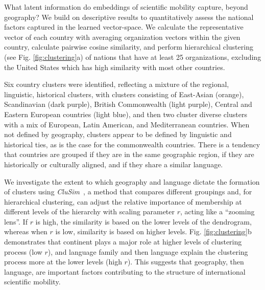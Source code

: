 \documentclass[12pt]{article} %
\begin{document}
What latent information do embeddings of scientific mobility capture, beyond geography? 
We build on descriptive results to quantitatively assess the national factors captured in the learned vector-space.
We calculate the representative vector of each country with averaging organization vectors within the given country, calculate pairwise cosine similarity, and perform hierarchical clustering (see Fig. \ref{fig:clustering}a) of nations that have at least 25 organizations, excluding the United States which has high similarity with most other countries. 

Six country clusters were identified, reflecting a mixture of the regional, linguistic, historical clusters, with clusters consisting of East-Asian (orange), Scandinavian (dark purple), British Commonwealth (light purple), Central and Eastern European countries (light blue), and then two cluster diverse clusters with a mix of European, Latin American, and Mediterranean countries.
When not defined by geography, clusters appear to be defined by linguistic and historical ties, as is the case for the commonwealth countries. 
There is a tendency that countries are grouped if they are in the same geographic region, if they are historically or culturally aligned, and if they share a similar language. 

We investigate the extent to which geography and language dictate the formation of clusters using \textit{CluSim}~\autocite{gates2019element}, a method that compares different groupings and, for hierarchical clustering, can adjust the relative importance of membership at different levels of the hierarchy with scaling parameter $r$, acting like a ``zooming lens''.  
If $r$ is high, the similarity is based on the lower levels of the dendrogram, whereas when $r$ is low, similarity is based on higher levels. 
Fig. \ref{fig:clustering}b demonstrates that continent plays a major role at higher levels of clustering process (low $r$), and language family and then language explain the clustering process more at the lower levels (high $r$). 
This suggests that geography, then language, are important factors contributing to the structure of international scientific mobility.
\end{document}
